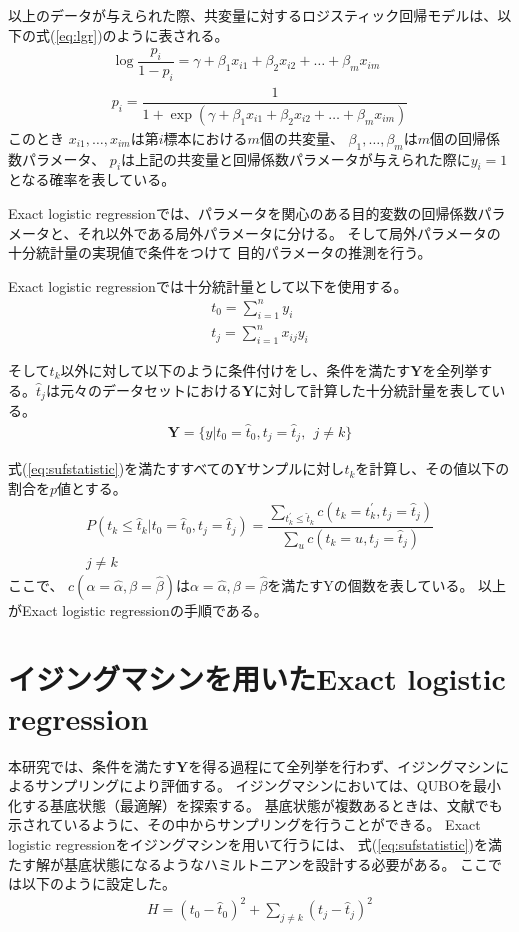 \documentclass[12pt, dvipdfmx]{jmaster}
\theoremstyle{definition}
\begin{document}
以上のデータが与えられた際、共変量に対するロジスティック回帰モデルは、以下の式(\ref{eq:lgr})のように表される。
\begin{eqnarray}
	\label{eq:lgr}
	\log　\dfrac{p_i}{1- p_i} = \gamma + \beta_1x_{i1} + \beta_2x_{i2} + \dots + \beta_mx_{im}\\
	p_i = \dfrac{1}{1+ \exp(\gamma + \beta_1x_{i1} + \beta_2x_{i2} + \dots + \beta_mx_{im})}\nonumber
\end{eqnarray}
このとき $x_{i1}, \dots , x_{im}$は第$i$標本における$m$個の共変量、
$\beta_1, \dots , \beta_m$は$m$個の回帰係数パラメータ、
$p_i$は上記の共変量と回帰係数パラメータが与えられた際に$y_i=1$となる確率を表している。

Exact logistic regressionでは、パラメータを関心のある目的変数の回帰係数パラメータと、それ以外である局外パラメータに分ける。
そして局外パラメータの十分統計量の実現値で条件をつけて
目的パラメータの推測を行う。

Exact logistic regressionでは十分統計量として以下を使用する。
\begin{eqnarray}
	t_0= \sum_{i=1}^n y_i\\
	t_j= \sum_{i=1}^n x_{ij} y_i 
\end{eqnarray}

そして$t_k$以外に対して以下のように条件付けをし、条件を満たす$\mathbf{Y}$を全列挙する。$\hat{t}_j$は元々のデータセットにおける$\mathbf{Y}$に対して計算した十分統計量を表している。
\begin{eqnarray}
	\mathbf{Y} = \{y|t_0=\hat{t}_0,  t_j=\hat{t}_j, ~~ j \neq k\}
	\label{eq:sufstatistic}
\end{eqnarray}

式(\ref{eq:sufstatistic})を満たすすべての$\mathbf{Y}$サンプルに対し$t_k$を計算し、その値以下の割合を$p$値とする。
\begin{eqnarray}
	P(t_k \le \hat{t}_k| t_0=\hat{t}_0,t_j=\hat{t}_j) = \dfrac{\sum_{t^\prime_k \le \hat{t}_k} c( t_k=t^\prime_k, t_j=\hat{t}_j)}{\sum_{u} c( t_k=u, t_j=\hat{t}_j)}\\
	j \neq k \nonumber
\end{eqnarray}
ここで、
$c(\alpha=\hat{\alpha}, \beta=\hat{\beta})$は$\alpha=\hat{\alpha}, \beta= \hat{\beta}$を満たすYの個数を表している。
以上がExact logistic regressionの手順である。

\section{イジングマシンを用いたExact logistic regression}
本研究では、条件を満たす$\mathbf{Y}$を得る過程にて全列挙を行わず、イジングマシンによるサンプリングにより評価する。
イジングマシンにおいては、QUBOを最小化する基底状態（最適解）を探索する。
基底状態が複数あるときは、文献\cite{sundar2019quantum}でも示されているように、その中からサンプリングを行うことができる。
Exact logistic regressionをイジングマシンを用いて行うには、
式(\ref{eq:sufstatistic})を満たす解が基底状態になるようなハミルトニアンを設計する必要がある。
ここでは以下のように設定した。
\begin{eqnarray}
	H = (t_0 - \hat{t}_0)^2 + \sum_{j \neq k} (t_j - \hat{t}_j)^2
\end{eqnarray}
\end{document}
